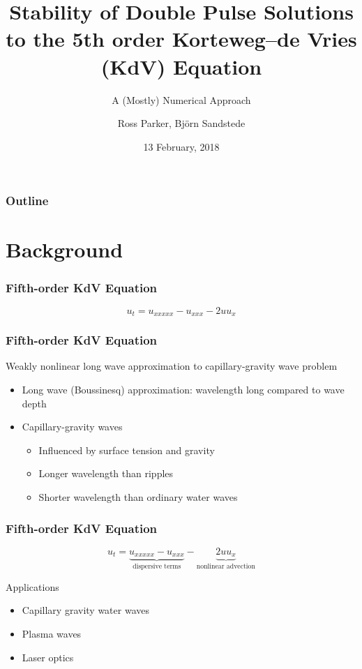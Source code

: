 \documentclass[16pt]{beamer}
\title[Stability of Double Pulses]{Stability of Double Pulse Solutions to the 5th order Korteweg–de Vries (KdV) Equation}
\subtitle{A (Mostly) Numerical Approach}
\author[R. Parker]{Ross Parker, Bj\"{o}rn Sandstede}
\institute{Brown University}
\date{13 February, 2018}
\begin{document}
 
\frame{\titlepage}
 
\begin{frame}
\frametitle{Outline}
\tableofcontents
\end{frame}

\section{Background}

\begin{frame}
	\frametitle{Fifth-order KdV Equation }   
	\fontsize{18}{7.2}\selectfont
	\begin{center}
		\[ u_t = u_{xxxxx} - u_{xxx} - 2 u u_x \]
	\end{center}
\end{frame}

\begin{frame}
	\frametitle{Fifth-order KdV Equation }   
	\fontsize{16}{7.2}\selectfont
	Weakly nonlinear long wave approximation to capillary-gravity wave problem
	\vspace{0.5cm}
	\begin{itemize}
		\item Long wave (Boussinesq) approximation: wavelength long compared to wave depth
		\item Capillary-gravity waves
		\begin{itemize}
		    \item Influenced by surface tension and gravity
		    \item Longer wavelength than ripples
		    \item Shorter wavelength than ordinary water waves 
		\end{itemize}
	\end{itemize}
\end{frame}

\begin{frame}
	\frametitle{Fifth-order KdV Equation}
	\fontsize{18}{7.2}\selectfont
	\begin{description}
		\item<1->
			\begin{center}
			\[ u_t = \underbrace{u_{xxxxx} - u_{xxx}}_{\text{dispersive terms}} - \underbrace{ 2 u u_x}_{\text{nonlinear advection}} \]
			\end{center}
		\vspace{0.5cm}
		\item<2->

		Applications
		\begin{itemize}
			\item Capillary gravity water waves
			\item Plasma waves
			\item Laser optics
		\end{itemize}
	\end{description}
\end{frame}
\end{document}
